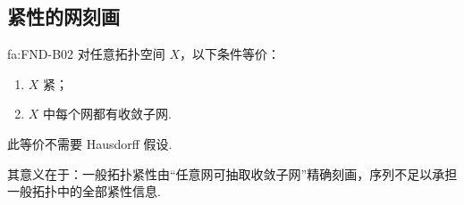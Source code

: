 \subsection{紧性的网刻画}

\begin{FATheorem}[B][紧性与收敛子网]{fa:FND-B02}
对任意拓扑空间 \(\displaystyle X\)，以下条件等价：
\begin{enumerate}[label=\textup{(\roman*)}]
\item \(\displaystyle X\) 紧；
\item \(\displaystyle X\) 中每个网都有收敛子网.
\end{enumerate}
此等价不需要 Hausdorff 假设.
\end{FATheorem}

其意义在于：一般拓扑紧性由“任意网可抽取收敛子网”精确刻画，序列不足以承担一般拓扑中的全部紧性信息.

